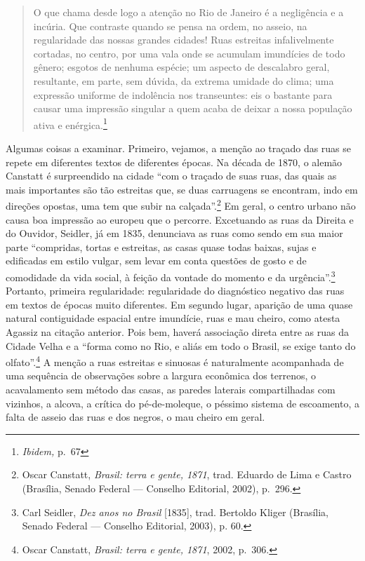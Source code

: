 \begin{quote}
O que chama desde logo a atenção no Rio de Janeiro é a negligência e a
incúria. Que contraste quando se pensa na ordem, no asseio, na
regularidade das nossas grandes cidades! Ruas estreitas infalivelmente
cortadas, no centro, por uma vala onde se acumulam imundícies de todo
gênero; esgotos de nenhuma espécie; um aspecto de descalabro geral,
resultante, em parte, sem dúvida, da extrema umidade do clima; uma
expressão uniforme de indolência nos transeuntes: eis o bastante para
causar uma impressão singular a quem acaba de deixar a nossa população
ativa e enérgica.\footnote{\textit{Ibidem,} p.~67}
\end{quote}

Algumas coisas a examinar. Primeiro, vejamos, a menção ao traçado das
ruas se repete em diferentes textos de diferentes épocas. Na década de
1870, o alemão Canstatt é surpreendido na cidade ``com o traçado de suas
ruas, das quais as mais importantes são tão estreitas que, se duas
carruagens se encontram, indo em direções opostas, uma tem que subir na
calçada''.\footnote{Oscar Canstatt, \textit{Brasil: terra e gente, 1871},
  trad. Eduardo de Lima e Castro (Brasília, Senado Federal --- Conselho
  Editorial, 2002), p.~296.} Em geral, o centro urbano não causa boa
impressão ao europeu que o percorre. Excetuando as ruas da Direita e do
Ouvidor, Seidler, já em 1835, denunciava as ruas como sendo em sua maior
parte ``compridas, tortas e estreitas, as casas quase todas baixas,
sujas e edificadas em estilo vulgar, sem levar em conta questões de
gosto e de comodidade da vida social, à feição da vontade do momento e
da urgência''.\footnote{Carl Seidler, \textit{Dez anos no Brasil}
  {[}1835{]}, trad. Bertoldo Kliger (Brasília, Senado Federal ---
  Conselho Editorial, 2003), p. 60.} Portanto, primeira regularidade:
regularidade do diagnóstico negativo das ruas em textos de épocas muito
diferentes. Em segundo lugar, aparição de uma quase natural contiguidade
espacial entre imundície, ruas e mau cheiro, como atesta Agassiz na
citação anterior. Pois bem, haverá associação direta entre as ruas da
Cidade Velha e a ``forma como no Rio, e aliás em todo o Brasil, se exige
tanto do olfato''.\footnote{Oscar Canstatt, \textit{Brasil: terra e gente,
  1871}, 2002, p.~306.} A menção a ruas estreitas e sinuosas é
naturalmente acompanhada de uma sequência de observações sobre a largura
econômica dos terrenos, o acavalamento sem método das casas, as paredes
laterais compartilhadas com vizinhos, a alcova, a crítica do
pé-de-moleque, o péssimo sistema de escoamento, a falta de asseio das
ruas e dos negros, o mau cheiro em geral.

